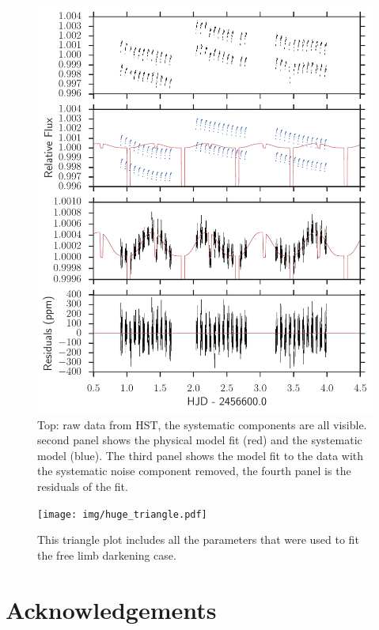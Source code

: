 \documentclass[a4paper,fleqn,usenatbib]{mnras}
\begin{document}
\begin{figure}
\begin{center}
\includegraphics[width=1.0\textwidth]{img/systematics.pdf}
\caption{Top: raw data from HST, the systematic components are all visible. second panel shows the physical model fit (red) and the systematic model (blue). The third panel shows the model fit to the data with the systematic noise component removed, the fourth panel is the residuals of the fit.
}
\label{fig:systematics}
\end{center}
\end{figure}

\begin{figure}
\begin{center}
\texttt{[image: img/huge\_triangle.pdf]}
\caption{This triangle plot includes all the parameters that were used to fit the free limb darkening case.}
\label{fig:big triangle}
\end{center}
\end{figure}

\section*{Acknowledgements}
\end{document}
